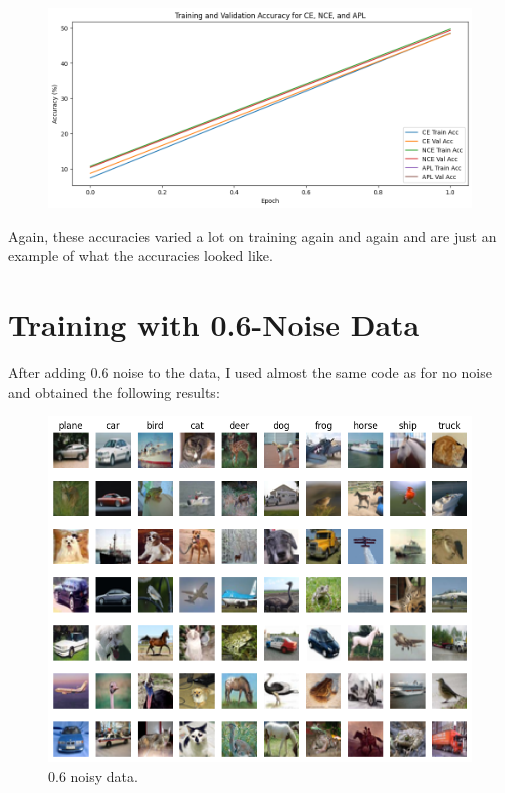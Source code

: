 \documentclass{article}
\begin{document}
\begin{figure}[htbp]
    \centering
    \includegraphics[width=\linewidth]{accuracies.png}  %
    \label{fig:your-label}
\end{figure}

Again, these accuracies varied a lot on training again and again and are just an example of what the accuracies looked like. 

\clearpage

\section*{Training with 0.6-Noise Data}

After adding 0.6 noise to the data, I used almost the same code as for no noise and obtained the following results:

\begin{figure}[H]
    \centering
    \includegraphics[width=\linewidth]{noisy_data.png}  %
    \caption{0.6 noisy data.}
    \label{fig:noisy-data}
\end{figure}
\FloatBarrier  %
\end{document}
